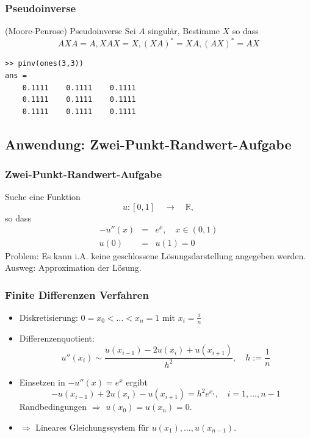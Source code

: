 \documentclass[hyperref={xetex}]{beamer}
\begin{document}
% 
%
\begin{frame}[fragile]\frametitle{Pseudoinverse}
\begin{block}{(Moore-Penrose) Pseudoinverse}
Sei $A$ singulär, Bestimme $X$ so dass 
\[ A X A=A,  X A X =X,  (X A)^* =X A,  (A X )^* = A X \]
\end{block}
\begin{lstlisting}
>> pinv(ones(3,3))
ans =
    0.1111    0.1111    0.1111
    0.1111    0.1111    0.1111
    0.1111    0.1111    0.1111
\end{lstlisting}
\end{frame}

\subsection{Anwendung: Zwei-Punkt-Randwert-Aufgabe}
%
%
\begin{frame}[fragile]\frametitle{Zwei-Punkt-Randwert-Aufgabe}

Suche eine Funktion 
\begin{equation*}
u:[0,1] \quad \rightarrow \quad \mathbb{R}, 
\end{equation*}
so dass 
\begin{eqnarray*}
-u''(x) & = & e^x, \quad x \in (0,1)\\
u(0) & = & u(1) =0
\end{eqnarray*}
\alert{Problem:} Es kann i.A. keine geschlossene
Lösungsdarstellung angegeben werden. \\ %

\alert{Ausweg:} Approximation der Lösung. 
\end{frame}
%
%
\begin{frame}[fragile]\frametitle{Finite Differenzen Verfahren}

\begin{itemize}
 \item Diskretisierung: $0=x_0 < \dots < x_{n}=1$ mit $x_i=\frac{i}{n}$
\item Differenzenquotient: 
\[ u''(x_i) \sim \frac{u(x_{i-1}) - 2 u(x_i) + u(x_{i+1})}{ 
  h^2}, \quad h:=\frac{1}{n} \]
\item Einsetzen in $-u''(x)=e^x$ ergibt 
\[ -u(x_{i-1}) + 2 u(x_i) - u(x_{i+1}) =  h^2 e^{x_i}, \quad
i=1,\dots ,n-1 \] 
Randbedingungen $\Rightarrow $ $u(x_0)=u(x_n)=0$.
\item $\Rightarrow$ Lineares Gleichungssystem für 
$u(x_1), \dots ,u(x_{n-1})$.
\end{itemize}

\end{frame}
\end{document}

